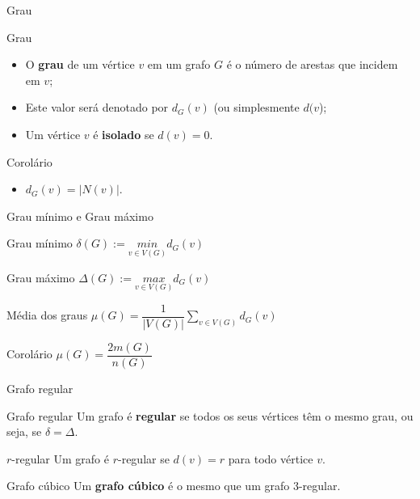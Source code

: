\documentclass[xcolor=dvipsnames,table]{beamer}
\begin{document}
	\begin{frame}{Grau}
		\begin{block}{Grau}
			\begin{itemize}
				\item O {\bf grau} de um vértice $v$ em um grafo $G$ é o número de arestas que incidem em $v$; 
				\item Este valor será denotado por $d_G(v)$ (ou simplesmente $d(v$);
				\item Um vértice $v$ é {\bf isolado} se $d(v) = 0$.
			\end{itemize}
		\end{block}
		\begin{block}{Corolário}
			\begin{itemize}
				\item $d_G(v) = |N(v)|$.
			\end{itemize}
		\end{block}		
	\end{frame}
	
	\begin{frame}[shrink]{Grau mínimo e Grau máximo}
		\begin{block}{Grau mínimo}
			$\delta(G) :=  \underset{v \in V(G)}{min} d_G(v)$
		\end{block} 
		\begin{block}{Grau máximo}
			$\Delta(G) :=  \underset{v \in V(G)}{max} d_G(v)$
		\end{block}
		\begin{block}{Média dos graus}
			$\mu(G) =  \dfrac{1}{|V(G)|} \underset{v \in V(G)}{\sum} d_G(v)$
		\end{block} 
		\begin{block}{Corolário}
			$\mu(G) = \dfrac{2m(G)}{n(G)}$
		\end{block}
	\end{frame}
	
	\begin{frame}{Grafo regular}
		\begin{block}{Grafo regular}
			Um grafo é {\bf regular} se todos os seus vértices têm o mesmo grau, ou seja, se $\delta = \Delta$.
		\end{block} 
		\begin{block}{$r$-regular}
			Um grafo é $r$-regular se $d(v) = r$ para todo vértice $v$.
		\end{block} 
		\begin{block}{Grafo cúbico}
			Um {\bf grafo cúbico} é o mesmo que um grafo 3-regular.
		\end{block}
	\end{frame}
\end{document}
